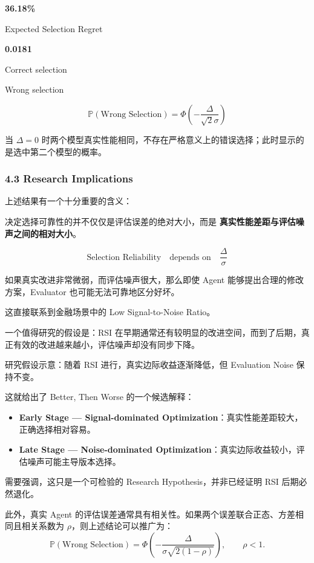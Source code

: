 \textbf{36.18\%}

Expected Selection Regret

\textbf{0.0181}

Correct selection

Wrong selection

\[\mathbb P(\text{Wrong Selection})=\Phi\left(-\frac{\Delta}{\sqrt{2}\sigma}\right)\]

当 \(\Delta=0\) 时两个模型真实性能相同，不存在严格意义上的错误选择；此时显示的是选中第二个模型的概率。

\hypertarget{part-2-16-0001-research-implications}{%
\subsubsection{4.3 Research Implications}\label{part-2-16-0001-research-implications}}

上述结果有一个十分重要的含义：

决定选择可靠性的并不仅仅是评估误差的绝对大小，而是 \textbf{真实性能差距与评估噪声之间的相对大小}。

\[\boxed{
\text{Selection Reliability}
\quad\text{depends on}\quad
\frac{\Delta}{\sigma}
}\]

如果真实改进非常微弱，而评估噪声很大，那么即使 Agent 能够提出合理的修改方案，Evaluator 也可能无法可靠地区分好坏。

这直接联系到金融场景中的 Low Signal-to-Noise Ratio。

一个值得研究的假设是：RSI 在早期通常还有较明显的改进空间，而到了后期，真正有效的改进越来越小，评估噪声却没有同步下降。


研究假设示意：随着 RSI 进行，真实边际收益逐渐降低，但 Evaluation Noise 保持不变。

这就给出了 Better, Then Worse 的一个候选解释：

\begin{itemize}
\tightlist
\item
  \textbf{Early Stage --- Signal-dominated Optimization}：真实性能差距较大，正确选择相对容易。
\item
  \textbf{Late Stage --- Noise-dominated Optimization}：真实边际收益较小，评估噪声可能主导版本选择。
\end{itemize}

需要强调，这只是一个可检验的 Research Hypothesis，并非已经证明 RSI 后期必然退化。

此外，真实 Agent 的评估误差通常具有相关性。如果两个误差联合正态、方差相同且相关系数为 \(\rho\)，则上述结论可以推广为：
\[\mathbb P(\text{Wrong Selection})
=
\Phi\left(
-\frac{\Delta}{\sigma\sqrt{2(1-\rho)}}
\right),
\qquad \rho<1.\]

